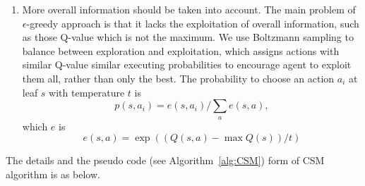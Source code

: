 \documentclass{article}
\begin{document}
\begin{enumerate}
  \item More overall information should be taken into account. The main problem of
  $\epsilon$-greedy approach is that it lacks the exploitation of overall information,
  such as those Q-value which is not the maximum. We use Boltzmann sampling to balance between
  exploration and exploitation, which assigns actions with similar Q-value similar executing
  probabilities to encourage agent to exploit them all, rather than only the best.
  The probability to choose an action $a_i$ at leaf $s$ with temperature $t$ is
    \begin{equation}
      p(s, a_i) = e(s, a_i)/ \sum_a{e(s, a)} \label{equ:boltzmann},
    \end{equation}  
  which $e$ is
    \begin{equation}
      e(s, a) = \exp( (Q(s, a) - \max Q(s))/t )
    \end{equation}

\end{enumerate}

The details and the pseudo code (see Algorithm~\ref{alg:CSM}) form of CSM algorithm is as below.
\end{document}
